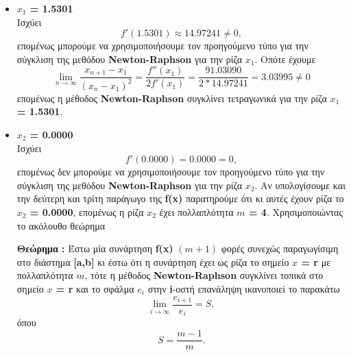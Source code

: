 \documentclass[First Project.tex]{subfiles}
\begin{document}
\begin{itemize}
        \item \textbf{$x_{1}$ = 1.5301} \\
            Ισχύει 
            \begin{equation*}
                f'( 1.5301 ) \approx 14.97241 \neq 0 ,
            \end{equation*}   
            επομένως μπορούμε να χρησιμοποιήσουμε τον προηγούμενο τύπο για την σύγκλιση της μεθόδου \textlatin{\textbf{Newton-Raphson}} για 
            την ρίζα \textlatin{\textbf{$x_{1}$}}. Οπότε έχουμε
            \begin{equation*}
                \lim_{n\to\infty} \frac{x_{n+1} - x_{1}}{(x_{n} - x_{1})^{2}} = \frac{f''(x_{1})}{2f'(x_{1})} = \frac{91.03090}{2 * 14.97241} = 3.03995 \neq 0
            \end{equation*}
            επομένως η μέθοδος \textlatin{\textbf{Newton-Raphson}} συγκλίνει τετραγωνικά για την ρίζα \textbf{$x_{1}$ = 1.5301}.
        \item \textbf{$x_{2}$ = 0.0000} \\
            Ισχύει 
            \begin{equation*}
                f'( 0.0000 ) = 0.0000 = 0 ,
            \end{equation*}   
            επομένως δεν μπορούμε να χρησιμοποιήσουμε τον προηγούμενο τύπο για την σύγκλιση της μεθόδου \textlatin{\textbf{Newton-Raphson}} για 
            την ρίζα \textlatin{\textbf{$x_{2}$}}. Αν υπολογίσουμε και την δεύτερη και τρίτη παράγωγο της \textlatin{\textbf{f(x)}} παρατηρούμε ότι
            κι αυτές έχουν ρίζα το \textbf{$x_{2}$ = 0.0000}, επομένως η ρίζα \textbf{$x_{2}$} έχει πολλαπλότητα \textbf{$m$ = 4}. Χρησιμοποιώντας το 
            ακόλουθο θεώρημα 
            
            \large{\textbf{Θεώρημα : }} \normalsize Έστω μία συνάρτηση \textlatin{\textbf{f(x)}} $( m+1 )$ φορές συνεχώς παραγωγίσιμη στο διάστημα \textlatin{\textbf{[a,b]}} κι
            έστω ότι η συνάρτηση έχει ως ρίζα το σημείο \textbf{\textlatin{$x$ = r}} με πολλαπλότητα \textbf{$m$}, τότε η μέθοδος \textlatin{\textbf{Newton-Raphson}}
            συγκλίνει τοπικά στο σημείο \textbf{\textlatin{$x$ = r}} και το σφάλμα \textbf{\textlatin{$e_{i}$}} στην \textlatin{\textbf{i}}-οστή  
            επανάληψη ικανοποιεί το παρακάτω 
            \begin{equation*}
                \lim_{i\to\infty} \frac{e_{i+1}}{e_{i}} = S,     
            \end{equation*}
            όπου
            \begin{equation*}
                S = \frac{m-1}{m}.
            \end{equation*}


\end{itemize}
\end{document}
